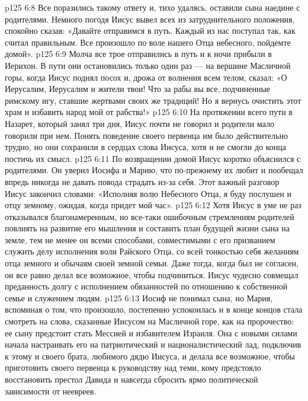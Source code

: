 \vs p125 6:8 Все поразились такому ответу и, тихо удалясь, оставили сына наедине с родителями. Немного погодя Иисус вывел всех из затруднительного положения, спокойно сказав: «Давайте отправимся в путь. Каждый из нас поступал так, как считал правильным. Все произошло по воле нашего Отца небесного, пойдемте домой».
\vs p125 6:9 Молча все трое отправились в путь и к ночи прибыли в Иерихон. В пути они остановились только один раз --- на вершине Масличной горы, когда Иисус поднял посох и, дрожа от волнения всем телом, сказал: «О Иерусалим, Иерусалим и жители твои! Что за рабы вы все, подчиненные римскому игу, ставшие жертвами своих же традиций! Но я вернусь очистить этот храм и избавить народ мой от рабства!»
\vs p125 6:10 На протяжении всего пути в Назарет, который занял три дня, Иисус почти не говорил и родители мало говорили при нем. Понять поведение своего первенца им было действительно трудно, но они сохранили в сердцах слова Иисуса, хотя и не смогли до конца постичь их смысл.
\vs p125 6:11 По возвращении домой Иисус коротко объяснился с родителями. Он уверил Иосифа и Марию, что по\hyp{}прежнему их любит и пообещал впредь никогда не давать повода страдать из\hyp{}за себя. Этот важный разговор Иисус закончил словами: «Исполняя волю Небесного Отца, я буду послушен и отцу земному, ожидая, когда придет мой час».
\vs p125 6:12 \pc Хотя Иисус в уме не раз отказывался  благонамеренным, но все\hyp{}таки ошибочным стремлениям родителей повлиять на развитие его мышления и составить план будущей жизни сына на земле, тем не менее он всеми способами, совместимыми с его призванием служить делу исполнения воли Райского Отца, со всей тонкостью  себя желаниям отца земного и обычаям своей земной семьи. Даже тогда, когда был не согласен, он все равно делал все возможное, чтобы подчиниться. Иисус чудесно совмещал преданность долгу с исполнением обязанностей по отношению к собственной семье и служением людям.
\vs p125 6:13 \pc Иосиф не понимал сына, но Мария, вспоминая о том, что произошло, постепенно успокоилась и в конце концов стала смотреть на слова, сказанные Иисусом на Масличной горе, как на пророчество: ее сыну предстоит стать Мессией и избавителем Израиля. Она с новыми силами начала настраивать его на патриотический и националистический лад, подключив к этому и своего брата, любимого дядю Иисуса, и делала все возможное, чтобы приготовить своего первенца к руководству над теми, кому предстояло восстановить престол Давида и навсегда сбросить ярмо политической зависимости от неевреев.
